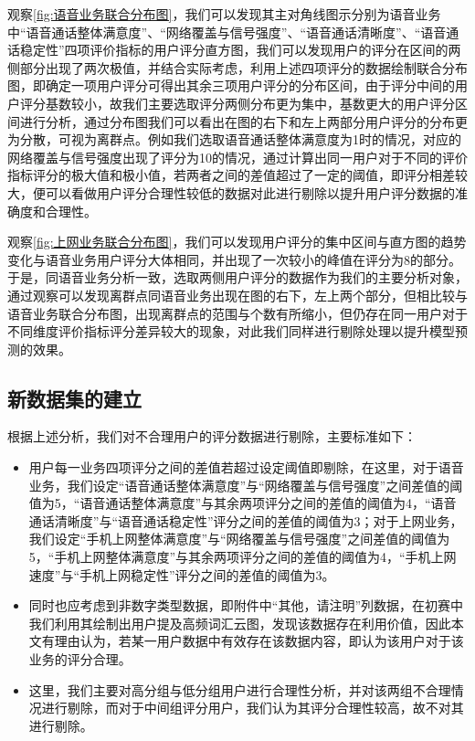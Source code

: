 \documentclass{MathorCupmodeling}
\begin{document}
	观察\textcolor{blue}{\cref{fig:语音业务联合分布图}}，我们可以发现其主对角线图示分别为语音业务中“语音通话整体满意度”、“网络覆盖与信号强度”、“语音通话清晰度”、“语音通话稳定性”四项评价指标的用户评分直方图，我们可以发现用户的评分在区间的两侧部分出现了两次极值，并结合实际考虑，利用上述四项评分的数据绘制联合分布图，即确定一项用户评分可得出其余三项用户评分的分布区间，由于评分中间的用户评分基数较小，故我们主要选取评分两侧分布更为集中，基数更大的用户评分区间进行分析，通过分布图我们可以看出在图的右下和左上两部分用户评分的分布更为分散，可视为离群点。例如我们选取语音通话整体满意度为1时的情况，对应的网络覆盖与信号强度出现了评分为10的情况，通过计算出同一用户对于不同的评价指标评分的极大值和极小值，若两者之间的差值超过了一定的阈值，即评分相差较大，便可以看做用户评分合理性较低的数据对此进行剔除以提升用户评分数据的准确度和合理性。
	
	观察\textcolor{blue}{\cref{fig:上网业务联合分布图}}，我们可以发现用户评分的集中区间与直方图的趋势变化与语音业务用户评分大体相同，并出现了一次较小的峰值在评分为8的部分。于是，同语音业务分析一致，选取两侧用户评分的数据作为我们的主要分析对象，通过观察可以发现离群点同语音业务出现在图的右下，左上两个部分，但相比较与语音业务联合分布图，出现离群点的范围与个数有所缩小，但仍存在同一用户对于不同维度评价指标评分差异较大的现象，对此我们同样进行剔除处理以提升模型预测的效果。
	
	\subsection{新数据集的建立}
	根据上述分析，我们对不合理用户的评分数据进行剔除，主要标准如下：
	\begin{itemize}
		\item 用户每一业务四项评分之间的差值若超过设定阈值即剔除，在这里，对于语音业务，我们设定“语音通话整体满意度”与“网络覆盖与信号强度”之间差值的阈值为5，“语音通话整体满意度”与其余两项评分之间的差值的阈值为4，“语音通话清晰度”与“语音通话稳定性”评分之间的差值的阈值为3；对于上网业务，我们设定“手机上网整体满意度”与“网络覆盖与信号强度”之间差值的阈值为5，“手机上网整体满意度”与其余两项评分之间的差值的阈值为4，“手机上网速度”与“手机上网稳定性”评分之间的差值的阈值为3。
		\item 同时也应考虑到非数字类型数据，即附件中“其他，请注明”列数据，在初赛中我们利用其绘制出用户提及高频词汇云图，发现该数据存在利用价值，因此本文有理由认为，若某一用户数据中有效存在该数据内容，即认为该用户对于该业务的评分合理。
		\item 这里，我们主要对高分组与低分组用户进行合理性分析，并对该两组不合理情况进行剔除，而对于中间组评分用户，我们认为其评分合理性较高，故不对其进行剔除。
	\end{itemize}
\end{document}
